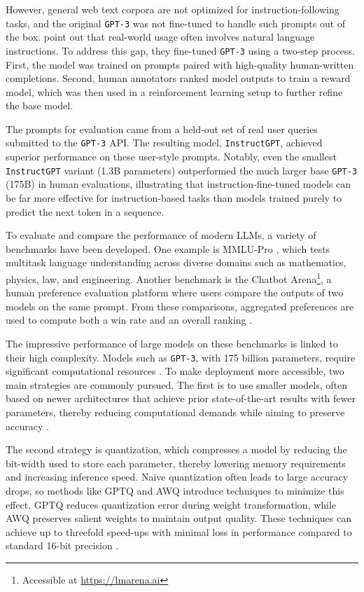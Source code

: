 \documentclass[a4paper,oneside,bibliography=totoc]{scrbook}
\begin{document}
However, general web text corpora are not optimized for instruction-following tasks, and the original \texttt{GPT-3} was not fine-tuned to handle such prompts out of the box. \citet{Ouyang2022} point out that real-world usage often involves natural language instructions. To address this gap, they fine-tuned \texttt{GPT-3} using a two-step process. First, the model was trained on prompts paired with high-quality human-written completions. Second, human annotators ranked model outputs to train a reward model, which was then used in a reinforcement learning setup to further refine the base model.

The prompts for evaluation came from a held-out set of real user queries submitted to the \texttt{GPT-3} API. The resulting model, \texttt{InstructGPT}, achieved superior performance on these user-style prompts. Notably, even the smallest \texttt{InstructGPT} variant (1.3B parameters) outperformed the much larger base \texttt{GPT-3} (175B) in human evaluations, illustrating that instruction-fine-tuned models can be far more effective for instruction-based tasks than models trained purely to predict the next token in a sequence.

To evaluate and compare the performance of modern \acp{LLM}, a variety of benchmarks have been developed. One example is MMLU-Pro \cite{Wang2024}, which tests multitask language understanding across diverse domains such as mathematics, physics, law, and engineering. Another benchmark is the Chatbot Arena\footnote{Accessible at \url{https://lmarena.ai}}, a human preference evaluation platform where users compare the outputs of two models on the same prompt. From these comparisons, aggregated preferences are used to compute both a win rate and an overall ranking \cite{Chiang2024}.

The impressive performance of large models on these benchmarks is linked to their high complexity. Models such as \texttt{GPT-3}, with 175 billion parameters, require significant computational resources \cite{Brown2020,Frantar2023}. To make deployment more accessible, two main strategies are commonly pursued. The first is to use smaller models, often based on newer architectures that achieve prior state-of-the-art results with fewer parameters, thereby reducing computational demands while aiming to preserve accuracy \cite{Grattafiori2024,Meta2024}.

The second strategy is quantization, which compresses a model by reducing the bit-width used to store each parameter, thereby lowering memory requirements and increasing inference speed. Naive quantization often leads to large accuracy drops, so methods like GPTQ and AWQ introduce techniques to minimize this effect. GPTQ reduces quantization error during weight transformation, while AWQ preserves salient weights to maintain output quality. These techniques can achieve up to threefold speed-ups with minimal loss in performance compared to standard 16-bit precision \cite{Frantar2023,Lin2024}.
\end{document}
